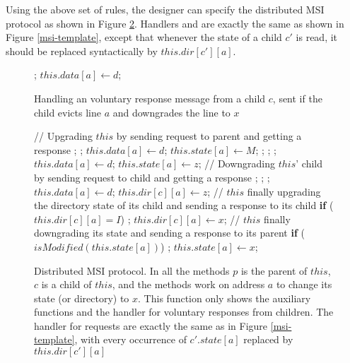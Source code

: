 Using the above set of rules, the designer can specify the distributed MSI protocol as shown in
Figure \ref{realistic}. Handlers \uReq{} and \dReq{} are exactly the same as
shown in Figure \ref{msi-template}, except that whenever the state of a child
$c'$ is read, it should be replaced syntactically by $this.dir[c'][a]$.

\begin{figure}
\small
\begin{algorithmic}
    \State \receive{} ;
    \State $this.data[a] \gets d$;
  \EndIf
\EndProc
\end{algorithmic}
\caption{Handling an voluntary response message from a child $c$, sent if the
child evicts line $a$ and downgrades the line to $x$}
\label{msi-unsolicited}
\end{figure}

\begin{figure}
\small

\begin{algorithmic}
\State // Upgrading $this$ by sending request to parent and getting a response
    \State \send{} ;
    \State \receive{} ;
    \State $this.data[a] \gets d$;
    \State $this.state[a] \gets M$;
  \Else
  \State \send{} ;
  \State \receive{} ;
    \State \receive{} ;
    \State $this.data[a] \gets d$;
  \EndIf
  \State $this.state[a] \gets z$;
  \EndIf
\EndProc
\State // Downgrading $this$' child by sending request to child and getting a
response
  \State \send{} ;
  \State \receive{} ;
    \State \receive{} ;
    \State $this.data[a] \gets d$;
  \EndIf
  \State $this.dir[c][a] \gets z$;
  \EndWhile
\EndProc
\State // $this$ finally upgrading the directory state of its child and sending
a response to its child
  \State \textbf{if} ($this.dir[c][a] = I$)
  \State \;\;\;\; \send{} ;
  \State $this.dir[c][a] \gets x$;
\EndProc
\State // $this$ finally downgrading its state and sending a response to its
parent
  \State \textbf{if} ($isModified(this.state[a])$)
  \State \;\;\;\; \send{} ;
  \State $this.state[a] \gets x$;
\EndProc
\end{algorithmic}
\caption{Distributed MSI protocol. In all the methods $p$ is the parent of
$this$, $c$ is a child of $this$, and the methods work on address $a$ to change
its state (or directory) to $x$. This function only shows the auxiliary
functions and the handler for voluntary responses from children. The handler
for requests are exactly the same as in Figure \ref{msi-template}, with every
occurrence of $c'.state[a]$ replaced by $this.dir[c'][a]$}
\label{realistic}
\end{figure}

